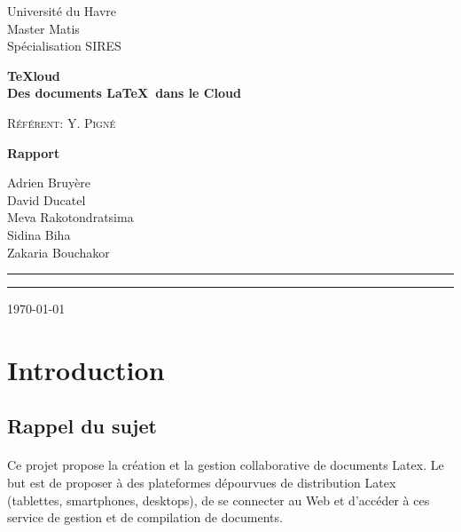 \documentclass[a4paper,12pt]{article}
\begin{document}

\begin{titlepage}
\begin{flushleft}
\large{Universit\'e du Havre \\
Master Matis \\
Sp\'ecialisation SIRES\\
}
\end{flushleft}

\setlength{\parskip}{96pt}

\begin{center}
\huge\textbf{TeXloud\\Des documents \LaTeX ~dans le Cloud}

\setlength{\parskip}{18pt}
\large\textsc{Référent: Y. Pigné}

\setlength{\parskip}{70pt}

\Large\textbf{Rapport}

\setlength{\parskip}{50pt}

\large Adrien Bruyère\\David Ducatel\\Meva Rakotondratsima\\Sidina Biha\\Zakaria Bouchakor
\end{center}
\setlength{\parskip}{50pt}
\begin{flushleft}
\rule{.4mm}{26mm}\rule{105mm}{.4mm}
\today
\end{flushleft}
\end{titlepage}

 
\clearpage

\tableofcontents

\newpage

\section{Introduction}
\subsection{Rappel du sujet}
\paragraph*{}
Ce projet propose la création et la gestion collaborative de documents
Latex. Le but est de proposer à des plateformes dépourvues de distribution
Latex (tablettes, smartphones, desktops), de se connecter au Web et
d'accéder à ces service de gestion et de compilation de documents.
\end{document}
